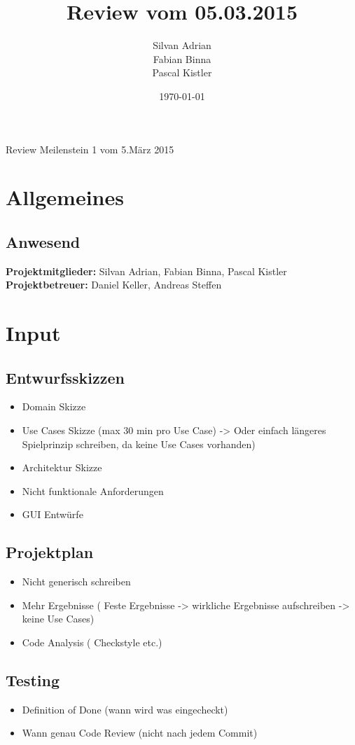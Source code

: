 \documentclass[11pt]{scrartcl}
\title{Review vom 05.03.2015}
\author{Silvan Adrian \\ Fabian Binna \\ Pascal Kistler}
\date{\today{}}
\begin{document}
{\huge Review Meilenstein 1 vom 5.März 2015}

\section{Allgemeines}
\label{sec:Allgemein}

\subsection{Anwesend}
\label{sec:Anwesend}
\textbf{Projektmitglieder:} Silvan Adrian, Fabian Binna, Pascal Kistler \\
\textbf{Projektbetreuer:} Daniel Keller, Andreas Steffen
\section{Input}
\label{sec:Input}
\subsection{Entwurfsskizzen}
\label{sec:Entwurfsskizzen}
\begin{itemize}
      \item Domain Skizze
	 \item Use Cases Skizze (max 30 min pro Use Case) -> Oder einfach längeres Spielprinzip schreiben, da keine Use Cases vorhanden)
	\item Architektur Skizze
	\item Nicht funktionale Anforderungen
	\item GUI Entwürfe
\end{itemize}

\subsection{Projektplan}
\label{sec:Projektplan}
\begin{itemize}
      \item Nicht generisch schreiben
	\item Mehr Ergebnisse ( Feste Ergebnisse -> wirkliche Ergebnisse aufschreiben -> keine Use Cases)
	\item Code Analysis ( Checkstyle etc.)
\end{itemize}

\subsection{Testing}
\label{sec:Testing}
\begin{itemize}
      \item Definition of Done (wann wird was eingecheckt)
	\item Wann genau Code Review (nicht nach jedem Commit)
\end{itemize}
\end{document}
